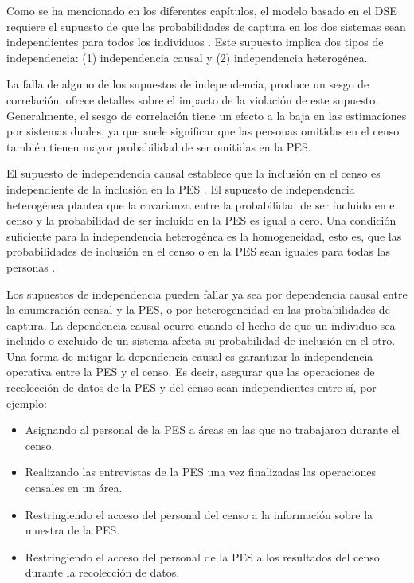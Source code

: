 \documentclass[
  12pt,
]{book}
\providecommand{\tightlist}{%
  \setlength{\itemsep}{0pt}\setlength{\parskip}{0pt}}
\begin{document}
Como se ha mencionado en los diferentes capítulos, el modelo basado en el DSE requiere el supuesto de que las probabilidades de captura en los dos sistemas sean independientes para todos los individuos \citep{wolter1986coverage}. Este supuesto implica dos tipos de independencia: (1) independencia causal y (2) independencia heterogénea.

La falla de alguno de los supuestos de independencia, produce un sesgo de correlación. \citep{griffin2000correlationbias} ofrece detalles sobre el impacto de la violación de este supuesto. Generalmente, el sesgo de correlación tiene un efecto a la baja en las estimaciones por sistemas duales, ya que suele significar que las personas omitidas en el censo también tienen mayor probabilidad de ser omitidas en la PES.

El supuesto de independencia causal establece que la inclusión en el censo es independiente de la inclusión en la PES \citep{wolter1986coverage}. El supuesto de independencia heterogénea plantea que la covarianza entre la probabilidad de ser incluido en el censo y la probabilidad de ser incluido en la PES es igual a cero. Una condición suficiente para la independencia heterogénea es la homogeneidad, esto es, que las probabilidades de inclusión en el censo o en la PES sean iguales para todas las personas \citep{mulry1991total}.

Los supuestos de independencia pueden fallar ya sea por dependencia causal entre la enumeración censal y la PES, o por heterogeneidad en las probabilidades de captura. La dependencia causal ocurre cuando el hecho de que un individuo sea incluido o excluido de un sistema afecta su probabilidad de inclusión en el otro. Una forma de mitigar la dependencia causal es garantizar la independencia operativa entre la PES y el censo. Es decir, asegurar que las operaciones de recolección de datos de la PES y del censo sean independientes entre sí, por ejemplo:

\begin{itemize}
\tightlist
\item
  Asignando al personal de la PES a áreas en las que no trabajaron durante el censo.
\item
  Realizando las entrevistas de la PES una vez finalizadas las operaciones censales en un área.
\item
  Restringiendo el acceso del personal del censo a la información sobre la muestra de la PES.
\item
  Restringiendo el acceso del personal de la PES a los resultados del censo durante la recolección de datos.
\end{itemize}
\end{document}
